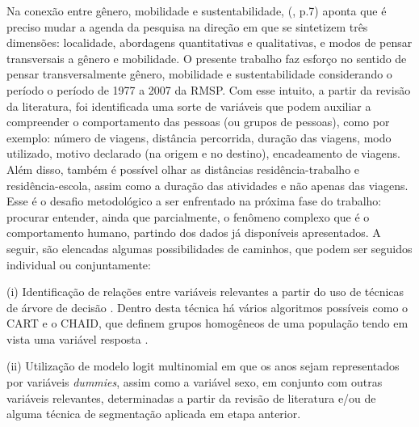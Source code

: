 Na conexão entre gênero, mobilidade e sustentabilidade,  (\citeyear{HANSON2010}, p.7) aponta que é preciso mudar a agenda da pesquisa na direção em que se sintetizem três dimensões: localidade, abordagens quantitativas e qualitativas, e modos de pensar transversais a gênero e mobilidade. O presente trabalho faz esforço no sentido de pensar transversalmente gênero, mobilidade e sustentabilidade considerando o período o período de 1977 a 2007 da RMSP.
Com esse intuito, a partir da revisão da literatura, foi identificada uma sorte de variáveis que podem auxiliar a compreender o comportamento das pessoas (ou grupos de pessoas), como por exemplo: número de viagens, distância percorrida, duração das viagens, modo utilizado, motivo declarado (na origem e no destino),  encadeamento de viagens. Além disso, também é possível olhar as distâncias residência-trabalho e residência-escola, assim como a duração das atividades e não apenas das viagens. Esse é o desafio metodológico a ser enfrentado na próxima fase do trabalho: procurar entender, ainda que parcialmente, o fenômeno complexo que é o comportamento humano, partindo dos dados já disponíveis apresentados.
A seguir, são elencadas algumas possibilidades de caminhos, que podem ser seguidos individual ou conjuntamente:

(i) Identificação de relações entre variáveis relevantes a partir do uso de técnicas de árvore de decisão \cite{MITCHELL1997,  PITOMBO2013}. Dentro desta técnica há vários algoritmos possíveis \cite{BREIMAN1984}
como o CART \cite{DENISON1998,FABRICIUS2000} e o CHAID, que definem grupos homogêneos de uma população tendo em vista uma variável resposta \cite{MAGIDSON1994, STRAMBI1998}.

(ii) Utilização de modelo logit multinomial em que os anos sejam representados por variáveis \emph{dummies}, assim como a variável sexo, em conjunto com outras variáveis relevantes, determinadas a partir da revisão de literatura e/ou de alguma técnica de segmentação aplicada em etapa anterior.

